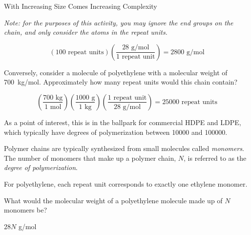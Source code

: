 \begin{activity}{With Increasing Size Comes Increasing Complexity}
\begin{ctqs}
				\emph{Note: for the purposes of this activity, you may ignore the  end groups on the chain, and only consider the atoms in the repeat units.}
	
		\begin{solution}[1.5in]
		
			\begin{equation*}
				\left(100\text{ repeat units}\right)\left(\frac{28\text{ g/mol}}{1\text{ repeat unit}}\right) = 2800\text{ g/mol}
			\end{equation*}
		\end{solution}
				
	\question Conversely, consider a molecule of polyethylene with a molecular weight of 700~kg/mol.  Approximately how many repeat units would this chain contain? \label{\labelbase:ctq:700kgPE}
	
		\begin{solution}[1.5in]
		\begin{equation*}
			\left(\frac{700\text{ kg}}{1\text{ mol}}\right)
			\left(\frac{1000\text{ g}}{1\text{ kg}}\right)
			\left(\frac{1\text{ repeat unit}}{28\text{ g/mol}}\right)
			= 25000\text{ repeat units}
		\end{equation*}
		
			As a point of interest, this is in the ballpark for commercial HDPE and LDPE, which typically have degrees of polymerization between 10000 and 100000.
		\end{solution}
	
\end{ctqs}

\begin{infobox}

	Polymer chains are typically synthesized from small molecules called \emph{monomers}.  The number of monomers that make up a polymer chain, $N$, is referred to as the \emph{degree of polymerization}.
	
	For polyethylene, each  repeat unit corresponds to exactly one ethylene monomer.

\end{infobox}

\begin{ctqs}
		
	\question What would the molecular weight of a polyethylene molecule made up of $N$ monomers be?
	
		\begin{solution}[1in]
			$28 N$ g/mol
		\end{solution}
		

\end{ctqs}
\end{activity}
